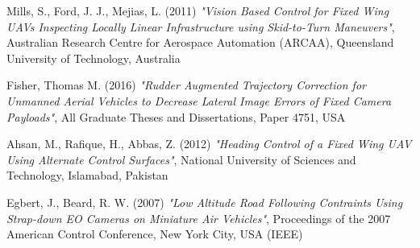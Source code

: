 \begin{thebibliography}{25}
	Mills, S., Ford, J. J., Mejias, L. (2011)
	\emph{"Vision Based Control for Fixed Wing UAVs Inspecting Locally Linear Infrastructure using Skid-to-Turn Maneuvers"}, 
	Australian Research Centre for Aerospace Automation (ARCAA), Queensland University of Technology, Australia
	
	Fisher, Thomas M. (2016)
	\emph{"Rudder Augmented Trajectory Correction for Unmanned Aerial Vehicles to Decrease Lateral Image Errors of Fixed Camera Payloads"},
	All Graduate Theses and Dissertations, Paper 4751, USA
	
	Ahsan, M., Rafique, H., Abbas, Z. (2012)
	\emph{"Heading Control of a Fixed Wing UAV Using Alternate Control Surfaces"},
	National University of Sciences and Technology, Islamabad, Pakistan
	
	Egbert, J., Beard, R. W. (2007)
	\emph{"Low Altitude Road Following Contraints Using Strap-down EO Cameras on Miniature Air Vehicles"},
	Proceedings of the 2007 American Control Conference, New York City, USA (IEEE)
	
\end{thebibliography}